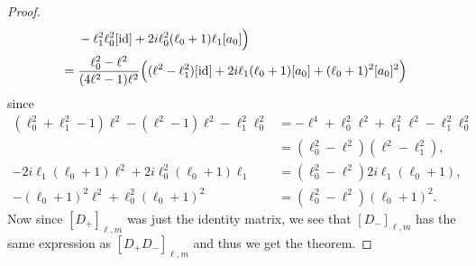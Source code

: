 \begin{proof}
\begin{align*}
    &\phantom{{}={}}{} - \ell_1^2\ell_0^2[\id] + 2i\ell_0^2(\ell_0+1)\ell_1[a_0]  \Bigr) \\
    &= \dfrac{\ell_0^2-\ell^2}{(4\ell^2-1)\ell^2}\Bigl( (\ell^2-\ell_1^2)[\id] + 2i\ell_1(\ell_0+1)[a_0] + (\ell_0+1)^2[a_0]^2  \Bigr)
  \end{align*}
  since
  \begin{align*}
    (\ell_0^2+\ell_1^2-1)\ell^2 - (\ell^2-1)\ell^2 - \ell_1^2\ell_0^2 &= -\ell^4 + \ell_0^2\ell^2 + \ell_1^2\ell^2  - \ell_1^2\ell_0^2 \\
                                                 &= (\ell_0^2-\ell^2)(\ell^2-\ell_1^2), \\
    -2i\ell_1(\ell_0+1)\ell^2 + 2i\ell_0^2(\ell_0+1)\ell_1 &= (\ell_0^2-\ell^2)2i\ell_1(\ell_0+1), \\
    -(\ell_0+1)^2\ell^2 + \ell_0^2(\ell_0+1)^2 &= (\ell_0^2-\ell^2)(\ell_0+1)^2.
  \end{align*}
  Now since $[D_+]_{\ell,m}$ was just the identity matrix, we see that $[D_-]_{\ell,m}$ has the same expression as $[D_+D_-]_{\ell,m}$ and thus we get the theorem. 
\end{proof}

